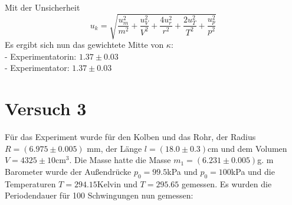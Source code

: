 \documentclass[bibliography=totocnumbered]{scrartcl}
\begin{document}
	Mit der Unsicherheit
	\begin{equation}\label{eq: Unsicherheit von Kappa V2}
		u_{k}=\sqrt{\dfrac{u_{m}^{2}}{m^{2}}+\dfrac{u_{V}^{2}}{V^{2}}+\dfrac{4u_{r}^{2}}{r^{2}}+\dfrac{2u_{T}^{2}}{T^{2}}+\dfrac{u_{p}^{2}}{p^{2}}}
	\end{equation}
	Es ergibt sich nun das gewichtete Mitte von $ \kappa $:\\
	- Experimentatorin: $ 1.37\pm 0.03 $\\
	- Experimentator: $ 1.37\pm 0.03 $
	
	
	
	\newpage
	\section{Versuch 3}
	Für das Experiment wurde für den Kolben und das Rohr, der Radius $ R=(6.975\pm 0.005) $ mm, der Länge $ l=(18.0\pm 0.3) $cm und dem Volumen $ V=4325\pm 10 $cm$ ^{3} $.
	Die Masse hatte die Masse $ m_{1}=(6.231\pm 0.005) $g.
	m Barometer wurde der Außendrücke $ p_{0}=99.5 $kPa und $ p_{0}=100 $kPa  und die Temperaturen $ T=294.15 $Kelvin und $ T=295.65 $ gemessen.
	Es wurden die Periodendauer für 100 Schwingungen nun gemessen:
	
\end{document}
